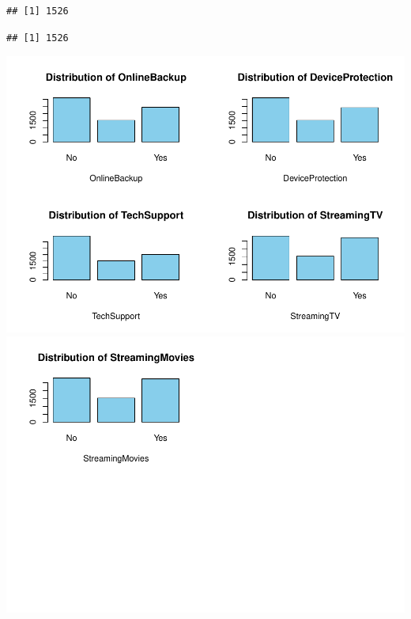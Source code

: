 \documentclass[
  twoside]{article}
\newenvironment{Shaded}{\begin{snugshade}}{\end{snugshade}}
\newcommand{\CommentTok}[1]{\textcolor[rgb]{0.56,0.35,0.01}{\textit{#1}}}
\newcommand{\FunctionTok}[1]{\textcolor[rgb]{0.13,0.29,0.53}{\textbf{#1}}}
\newcommand{\NormalTok}[1]{#1}
\newcommand{\SpecialCharTok}[1]{\textcolor[rgb]{0.81,0.36,0.00}{\textbf{#1}}}
\newcommand{\StringTok}[1]{\textcolor[rgb]{0.31,0.60,0.02}{#1}}
\begin{document}
\begin{Shaded}
\end{Shaded}

\begin{verbatim}
## [1] 1526
\end{verbatim}

\begin{Shaded}
\end{Shaded}

\begin{verbatim}
## [1] 1526
\end{verbatim}

\includegraphics{Assigment2_files/figure-latex/unnamed-chunk-28-1.pdf}
\includegraphics{Assigment2_files/figure-latex/unnamed-chunk-28-2.pdf}
\end{document}
